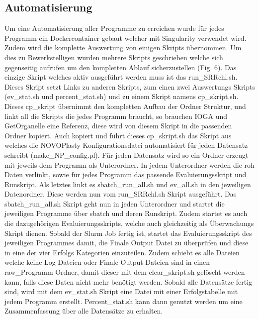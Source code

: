 \documentclass{scrartcl}
\begin{document}
\subsection{Automatisierung}
\label{sec-4-1}
Um eine Automatisierung aller Programme zu erreichen wurde für jedes Programm ein Dockercontainer gebaut welcher mit Singularity verwendet wird. Zudem wird die komplette Auswertung von einigen Skripts 
übernommen. Um dies zu Bewerkstelligen wurden mehrere Skripts geschrieben welche sich gegenseitig aufrufen um den kompletten Ablauf sicherzustellen (Fig. 6). 
Das einzige Skript welches aktiv ausgeführt werden muss ist das run\_SRRchl.sh. Dieses Skript setzt Links zu anderen Skripts, zum einen zwei Auswertungs Skripts (ev\_stat.sh und percent\_stat.sh) und
zu einem Skript namens cp\_skript.sh. Dieses cp\_skript übernimmt den kompletten Aufbau der Ordner Struktur, und linkt all die Skripts die jedes Programm braucht, so brauchen IOGA und GetOrganelle
eine Referenz, diese wird von diesem Skript in die passenden Ordner kopiert. Auch kopiert und führt dieses cp\_skript.sh das Skript aus welches die NOVOPlasty Konfigurationsdatei automatisiert für jeden
Datensatz schreibt (make\_NP\_config.pl). Für jeden Datensatz wird so ein Ordner erzeugt mit jeweils dem Programm als Unterordner. In jedem Unterordner werden die roh Daten verlinkt, sowie für jedes Programm
das passende Evaluierungsskript und Runskript. Als letztes linkt es sbatch\_run\_all.sh und ev\_all.sh in den jeweiligen Datenordner. Diese werden nun vom run\_SRRchl.sh Skript ausgeführt. Das sbatch\_run\_all.sh
Skript geht nun in jeden Unterordner und startet die jeweiligen Programme über sbatch und deren Runskript. Zudem startet es auch die dazugehörigen Evaluierungsskripts, welche auch gleichzeitig als Überwachungs
Skript dienen. Sobald der Slurm Job fertig ist, startet das Evaluierungsskript des jeweiligen Programmes damit, die Finale Output Datei zu überprüfen und diese in eine der vier Erfolgs Kategorien einzuteilen. Zudem
schiebt es alle Dateien welche keine Log Dateien oder Finale Output Dateien sind in einen raw\_Programm Ordner, damit dieser mit dem clear\_skript.sh gelöscht werden kann, falls diese Daten nicht mehr benötigt werden.
Sobald alle Datensätze fertig sind, wird mit dem ev\_stat.sh Skript eine Datei mit einer Erfolgstabelle mit jedem Programm erstellt. Percent\_stat.sh kann dann genutzt werden um eine Zusammenfassung über alle Datensätze 
zu erhalten.
\end{document}
